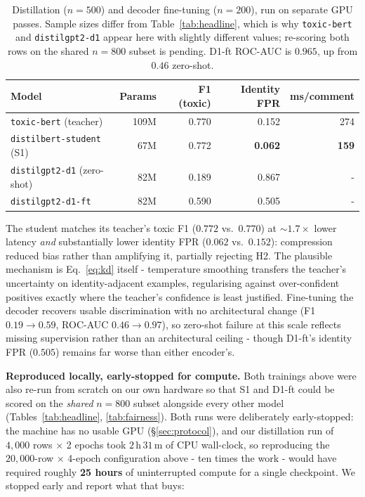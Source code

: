 \documentclass[10pt,a4paper]{article}
\begin{document}
\begin{table}[H]
\centering
\footnotesize
\setlength{\tabcolsep}{9pt}
\renewcommand{\arraystretch}{1.15}
\begin{tabular}{@{}l r r r r@{}}
\toprule
\textbf{Model} & \textbf{Params} & \textbf{F1 (toxic)} & \textbf{Identity FPR} & \textbf{ms/comment} \\
\midrule
\texttt{toxic-bert} (teacher)      & 109M & 0.770 & 0.152 & 274 \\
\rowcolor{rowgray}
\texttt{distilbert-student} (S1)   & 67M  & 0.772 & \textbf{0.062} & \textbf{159} \\
\midrule
\texttt{distilgpt2-d1} (zero-shot) & 82M  & 0.189 & 0.867 & - \\
\rowcolor{rowgray}
\texttt{distilgpt2-d1-ft}          & 82M  & 0.590 & 0.505 & - \\
\bottomrule
\end{tabular}
\caption{Distillation ($n{=}500$) and decoder fine-tuning ($n{=}200$), run on
separate GPU passes. Sample sizes differ from Table~\ref{tab:headline}, which is
why \texttt{toxic-bert} and \texttt{distilgpt2-d1} appear here with slightly
different values; re-scoring both rows on the shared $n{=}800$ subset is pending.
D1-ft ROC-AUC is $0.965$, up from $0.46$ zero-shot.}
\label{tab:kd}
\end{table}

The student matches its teacher's toxic F1 ($0.772$ vs.\ $0.770$) at ${\sim}1.7\times$
lower latency \emph{and} substantially lower identity FPR ($0.062$ vs.\ $0.152$):
compression reduced bias rather than amplifying it, partially rejecting H2. The
plausible mechanism is Eq.~\eqref{eq:kd} itself - temperature smoothing transfers
the teacher's uncertainty on identity-adjacent examples, regularising against
over-confident positives exactly where the teacher's confidence is least justified.
Fine-tuning the decoder recovers usable discrimination with no architectural change
(F1 $0.19 \to 0.59$, ROC-AUC $0.46 \to 0.97$), so zero-shot failure at this scale
reflects missing supervision rather than an architectural ceiling - though D1-ft's
identity FPR ($0.505$) remains far worse than either encoder's.

\textbf{Reproduced locally, early-stopped for compute.} Both trainings above were
also re-run from scratch on our own hardware so that S1 and D1-ft could be scored on
the \emph{shared} $n{=}800$ subset alongside every other model
(Tables~\ref{tab:headline}, \ref{tab:fairness}). Both runs were deliberately
early-stopped: the machine has no usable GPU (\S\ref{sec:protocol}), and our
distillation run of $4{,}000$ rows $\times$ 2 epochs took $2$\,h\,$31$\,m of CPU
wall-clock, so reproducing the $20{,}000$-row $\times$ 4-epoch configuration above -
ten times the work - would have required roughly \textbf{25 hours} of uninterrupted
compute for a single checkpoint. We stopped early and report what that buys:
\end{document}
